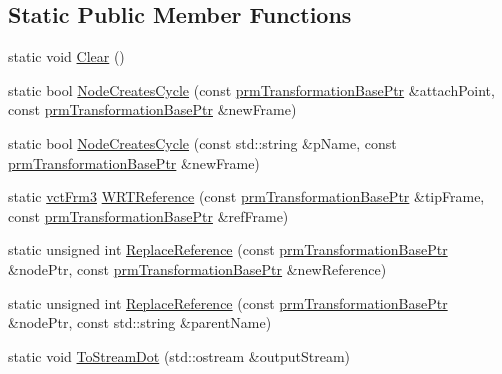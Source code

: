 \subsection*{Static Public Member Functions}
\begin{DoxyCompactItemize}
\item 
static void \hyperlink{classprm_transformation_manager_a528d7436d10bd51c9372303d44de08c6}{Clear} ()
\item 
static bool \hyperlink{classprm_transformation_manager_ae65877c7ac5cdfd00a584235b195bc46}{Node\+Creates\+Cycle} (const \hyperlink{prm_transformation_base_8h_a881a6a7d2191474974cdf36d79e1df08}{prm\+Transformation\+Base\+Ptr} \&attach\+Point, const \hyperlink{prm_transformation_base_8h_a881a6a7d2191474974cdf36d79e1df08}{prm\+Transformation\+Base\+Ptr} \&new\+Frame)
\item 
static bool \hyperlink{classprm_transformation_manager_ab21322d7f13ee4a88ce018539115267e}{Node\+Creates\+Cycle} (const std\+::string \&p\+Name, const \hyperlink{prm_transformation_base_8h_a881a6a7d2191474974cdf36d79e1df08}{prm\+Transformation\+Base\+Ptr} \&new\+Frame)
\item 
static \hyperlink{vct_transformation_types_8h_a81feda0a02c2d1bc26e5553f409fed20}{vct\+Frm3} \hyperlink{classprm_transformation_manager_a70706b6cb21dcd9fd6473a0d743e5ab3}{W\+R\+T\+Reference} (const \hyperlink{prm_transformation_base_8h_a881a6a7d2191474974cdf36d79e1df08}{prm\+Transformation\+Base\+Ptr} \&tip\+Frame, const \hyperlink{prm_transformation_base_8h_a881a6a7d2191474974cdf36d79e1df08}{prm\+Transformation\+Base\+Ptr} \&ref\+Frame)
\item 
static unsigned int \hyperlink{classprm_transformation_manager_a1ca6a4b49e0e1a7f649d82ffe58fad6c}{Replace\+Reference} (const \hyperlink{prm_transformation_base_8h_a881a6a7d2191474974cdf36d79e1df08}{prm\+Transformation\+Base\+Ptr} \&node\+Ptr, const \hyperlink{prm_transformation_base_8h_a881a6a7d2191474974cdf36d79e1df08}{prm\+Transformation\+Base\+Ptr} \&new\+Reference)
\item 
static unsigned int \hyperlink{classprm_transformation_manager_a4273afd47937e7e8e292f7b330d357d7}{Replace\+Reference} (const \hyperlink{prm_transformation_base_8h_a881a6a7d2191474974cdf36d79e1df08}{prm\+Transformation\+Base\+Ptr} \&node\+Ptr, const std\+::string \&parent\+Name)
\item 
static void \hyperlink{classprm_transformation_manager_a4c349fc7be9a84e703103cf1e0757c66}{To\+Stream\+Dot} (std\+::ostream \&output\+Stream)
\item 

\end{DoxyCompactItemize}
